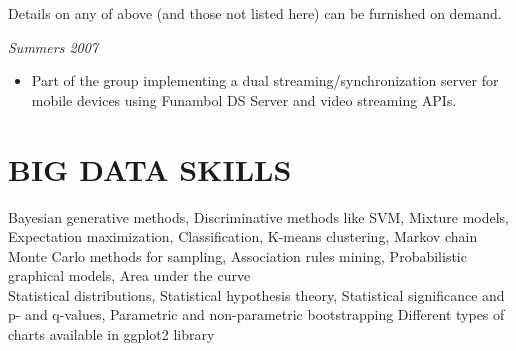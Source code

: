 \documentclass[margin, 10pt]{res} %
\begin{document}
\begin{resume}
Details on any of above (and those not listed here) can be furnished on demand.

{\sl \textbf{}} \hfill \textit{Summers 2007} \\
{\color{RubineRed}{Five Rivers Technologies, Lahore}}
\begin{itemize}
\item Part of the group implementing a dual streaming/synchronization server for mobile devices using Funambol DS Server and video streaming APIs.
\end{itemize} 

\section{BIG DATA SKILLS}
{\bf \color{Brown}{Machine Learning Skills:}} 
Bayesian generative methods, Discriminative methods like SVM, Mixture models, Expectation maximization, Classification, K-means clustering,  Markov chain Monte Carlo methods for sampling, Association rules mining, Probabilistic graphical models, Area under the curve  \\
{\bf \color{Brown}{Statistical Theory:}} Statistical distributions, Statistical hypothesis theory, Statistical significance and p- and q-values, Parametric and non-parametric bootstrapping
{\bf \color{Brown}{Statistical Visualization and reporting:}} Different types of charts available in ggplot2 library



\end{resume}
\end{document}
